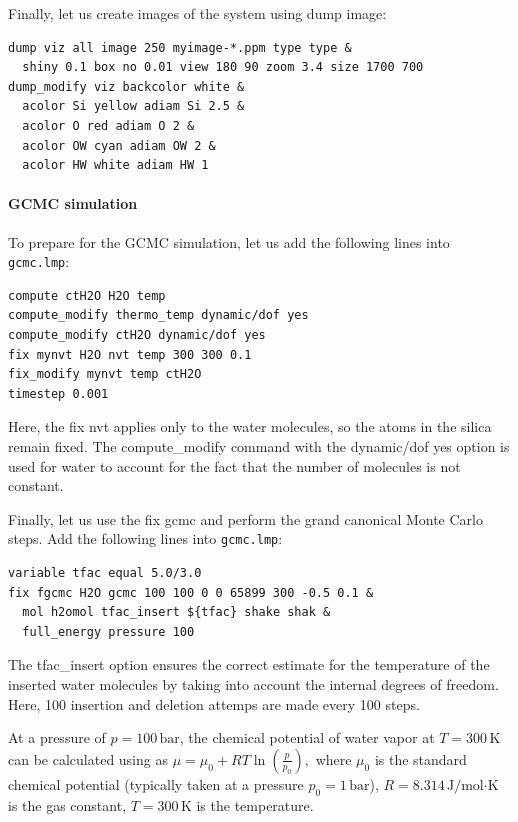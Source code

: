 \documentclass[9pt,tutorial]{livecoms}
\newcommand{\lmpcmd}[1]{\hspace{0pt}\colorbox{listing}{\textcolor{command}{\small{#1}}}\hspace{0pt}} %
\newcommand{\flecmd}[1]{\textcolor{command}{\texttt{#1}}} %
\begin{document}
Finally, let us create images
of the system using \lmpcmd{dump image}:
\begin{lstlisting}
dump viz all image 250 myimage-*.ppm type type &
  shiny 0.1 box no 0.01 view 180 90 zoom 3.4 size 1700 700
dump_modify viz backcolor white &
  acolor Si yellow adiam Si 2.5 &
  acolor O red adiam O 2 &
  acolor OW cyan adiam OW 2 &
  acolor HW white adiam HW 1
\end{lstlisting}

\paragraph{GCMC simulation}

To prepare for the GCMC simulation, let us add the
following lines into \flecmd{gcmc.lmp}:
\begin{lstlisting}
compute ctH2O H2O temp
compute_modify thermo_temp dynamic/dof yes
compute_modify ctH2O dynamic/dof yes
fix mynvt H2O nvt temp 300 300 0.1
fix_modify mynvt temp ctH2O
timestep 0.001
\end{lstlisting}
{\color{blue} Here, the \lmpcmd{fix nvt} applies only to the water molecules, so
the atoms in the silica remain fixed.  The \lmpcmd{compute\_modify} command with
the \lmpcmd{dynamic/dof yes} option is used for water to account for the fact
that the number of molecules is not constant.}

Finally, let us use the \lmpcmd{fix gcmc} and perform the grand canonical Monte
Carlo steps.  Add the following lines into \flecmd{gcmc.lmp}:
\begin{lstlisting}
variable tfac equal 5.0/3.0
fix fgcmc H2O gcmc 100 100 0 0 65899 300 -0.5 0.1 &
  mol h2omol tfac_insert ${tfac} shake shak &
  full_energy pressure 100
\end{lstlisting}
The \lmpcmd{tfac\_insert} option ensures the correct estimate for the temperature
of the inserted water molecules by taking into account the internal degrees of
freedom.  Here, 100 insertion and deletion attemps are made every 100 steps.

\begin{note}
At a pressure of $p = 100\,\text{bar}$, the chemical potential of water vapor at $T = 300\,\text{K}$
can be calculated using as $\mu = \mu_0 + RT \ln (\frac{p}{p_0}),$ where $\mu_0$ is the standard
chemical potential (typically taken at a pressure $p_0 = 1 \, \text{bar}$), $R = 8.314\, \text{J/mol·K}$
is the gas constant, $T = 300\,\text{K}$ is the temperature.
\end{note}
\end{document}
